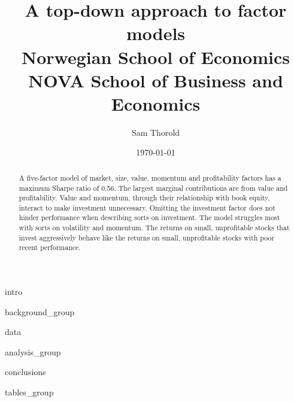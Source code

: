 \documentclass[a4paper, 12pt]{article}
\title{
  {A top-down approach to factor models}\\
  {\large Norwegian School of Economics}\\
  {\large NOVA School of Business and Economics}
}
\author{Sam Thorold}
\date{\today}
\begin{document}
\maketitle


\begin{abstract}
  A five-factor model of
  market, size, value, momentum and profitability factors
  has a maximum Sharpe ratio of 0.56.
  The largest marginal contributions are from value and profitability.
  Value and momentum, through their relationship with book equity,
  interact to make investment unnecessary.
  Omitting the investment factor does not hinder performance when describing
  sorts on investment.
  The model struggles most with sorts on volatility and momentum.
  The returns on small, unprofitable stocks that invest aggressively behave
  like the returns on small, unprofitable stocks with poor recent performance.
\end{abstract}

\pagebreak

{intro}

{background_group}

{data}

{analysis_group}

{conclusions}


\printbibliography

\appendix

{tables_group}

\end{document}
